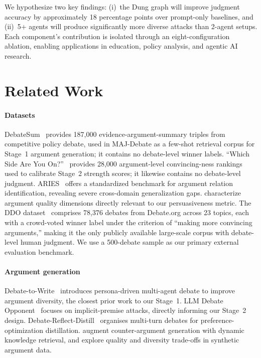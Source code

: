 \documentclass[11pt,twocolumn,letterpaper]{article}
\newcommand{\DebateSumArgs}{187{,}000}
\newcommand{\WhichSideArgs}{28{,}000}
\newcommand{\GraphGain}{18}
\newcommand{\DDOTotal}{78{,}376}
\newcommand{\DDOTopics}{23}
\newcommand{\DDOSample}{500}
\begin{document}
We hypothesize two key findings: (i)~the Dung graph will improve judgment
accuracy by approximately \GraphGain{} percentage points over prompt-only
baselines, and (ii)~5+ agents will produce significantly more diverse attacks
than 2-agent setups. Each component's contribution is isolated through an
eight-configuration ablation, enabling applications in education, policy
analysis, and agentic AI research.

\section{Related Work}

\paragraph{Datasets}
DebateSum~\citep{roush2020debatesum} provides \DebateSumArgs{}
evidence-argument-summary triples from competitive policy debate, used in
MAJ-Debate as a few-shot retrieval corpus for Stage~1 argument generation;
it contains no debate-level winner labels.
``Which Side Are You On?''~\citep{li2024whichside} provides \WhichSideArgs{}
argument-level convincing-ness rankings used to calibrate Stage~2 strength
scores; it likewise contains no debate-level judgment.
ARIES~\citep{gemechu2024aries} offers a standardized benchmark for argument
relation identification, revealing severe cross-domain generalization gaps.
\citet{ivanova2024lets} characterize argument quality dimensions directly
relevant to our persuasiveness metric.
The DDO dataset~\citep{durmus2019ddo} comprises \DDOTotal{} debates from
Debate.org across \DDOTopics{} topics, each with a crowd-voted winner
label under the criterion of ``making more convincing arguments,'' making
it the only publicly available large-scale corpus with debate-level human
judgment. We use a \DDOSample-debate sample as our primary external
evaluation benchmark.

\paragraph{Argument generation}
Debate-to-Write~\citep{hu2025debate2write} introduces persona-driven
multi-agent debate to improve argument diversity, the closest prior work
to our Stage~1. LLM Debate Opponent~\citep{ozaki2025llmdebate} focuses on
implicit-premise attacks, directly informing our Stage~2 design.
Debate-Reflect-Distill~\citep{zhou2025debatereflect} organises multi-turn
debates for preference-optimization distillation.
\citet{yeginbergen2025dynamic} augment counter-argument generation with
dynamic knowledge retrieval, and \citet{bao2025quality} explore
quality and diversity trade-offs in synthetic argument data.
\end{document}

